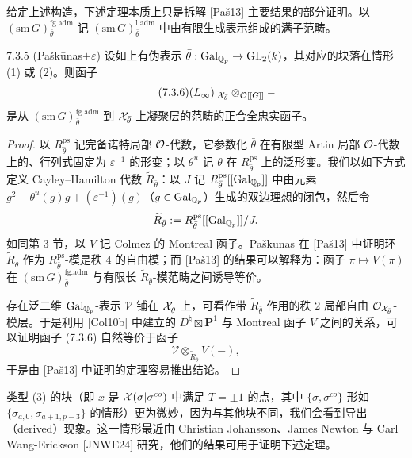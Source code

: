 给定上述构造，下述定理本质上只是拆解 [Paš13] 主要结果的部分证明。以 $(\mathrm{sm}\,G)^{\mathrm{fg.adm}}_{\bar\theta}$ 记 $(\mathrm{sm}\,G)^{\mathrm{l.adm}}_{\bar\theta}$ 中由有限生成表示组成的满子范畴。

\begin{thm}{7.3.5 (Paškūnas$+\varepsilon$)}\label{thm:a4-7-3-5}
设如上有伪表示 $\bar\theta:\operatorname{Gal}_{\mathbb{Q}_p}\to\mathrm{GL}_2(k)$，其对应的块落在情形 (1) 或 (2)。则函子
\begin{equation}\tag{7.3.6}\label{eq:a4-7-3-6}
(L_\infty)|_{\mathcal{X}_{\bar\theta}}\otimes_{\mathcal{O}[[G]]}-
\end{equation}
是从 $(\mathrm{sm}\,G)^{\mathrm{fg.adm}}_{\bar\theta}$ 到 $\mathcal{X}_{\bar\theta}$ 上凝聚层的范畴的正合全忠实函子。
\end{thm}

\begin{proof}
以 $R^{\mathrm{ps}}_{\bar\theta}$ 记完备诺特局部 $\mathcal{O}$-代数，它参数化 $\bar\theta$ 在有限型 Artin 局部 $\mathcal{O}$-代数上的、行列式固定为 $\varepsilon^{-1}$ 的形变；以 $\theta^u$ 记 $\bar\theta$ 在 $R^{\mathrm{ps}}_{\bar\theta}$ 上的泛形变。我们以如下方式定义 Cayley--Hamilton 代数 $\widetilde R_{\bar\theta}$：以 $J$ 记 $R^{\mathrm{ps}}_{\bar\theta}[[\operatorname{Gal}_{\mathbb{Q}_p}]]$ 中由元素 $g^2-\theta^u(g)g+(\varepsilon^{-1})(g)$（$g\in\operatorname{Gal}_{\mathbb{Q}_p}$）生成的双边理想的闭包，然后令
\[
\widetilde R_{\bar\theta}:=R^{\mathrm{ps}}_{\bar\theta}[[\operatorname{Gal}_{\mathbb{Q}_p}]]/J.
\]
如同第 3 节，以 $V$ 记 Colmez 的 Montreal 函子。Paškūnas 在 [Paš13] 中证明环 $\widetilde R_{\bar\theta}$ 作为 $R^{\mathrm{ps}}_{\bar\theta}$-模是秩 $4$ 的自由模；而 [Paš13] 的结果可以解释为：函子 $\pi\mapsto V(\pi)$ 在 $(\mathrm{sm}\,G)^{\mathrm{fg.adm}}_{\bar\theta}$ 与有限长 $\widetilde R_{\bar\theta}$-模范畴之间诱导等价。

存在泛二维 $\operatorname{Gal}_{\mathbb{Q}_p}$-表示 $\mathcal V$ 铺在 $\mathcal{X}_{\bar\theta}$ 上，可看作带 $\widetilde R_{\bar\theta}$ 作用的秩 $2$ 局部自由 $\mathcal{O}_{\mathcal{X}_{\bar\theta}}$-模层。于是利用 [Col10b] 中建立的 $D^\natural\boxtimes\mathbf P^1$ 与 Montreal 函子 $V$ 之间的关系，可以证明函子 (7.3.6) 自然等价于函子
\[
\mathcal V\otimes_{\widetilde R_{\bar\theta}}V(-),
\]
于是由 [Paš13] 中证明的定理容易推出结论。
\end{proof}

类型 (3) 的块（即 $x$ 是 $\mathcal{X}(\sigma|\sigma^{co})$ 中满足 $T=\pm1$ 的点，其中 $\{\sigma,\sigma^{co}\}$ 形如 $\{\sigma_{a,0},\sigma_{a+1,p-3}\}$ 的情形）更为微妙，因为与其他块不同，我们会看到导出（derived）现象。这一情形最近由 Christian Johansson、James Newton 与 Carl Wang-Erickson [JNWE24] 研究，他们的结果可用于证明下述定理。

